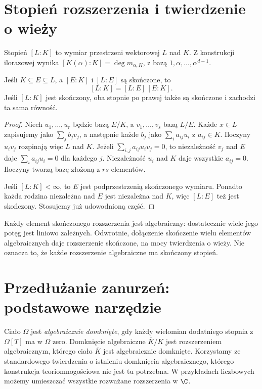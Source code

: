 \section{Stopień rozszerzenia i twierdzenie o wieży}

Stopień $[L:K]$ to wymiar przestrzeni wektorowej $L$ nad $K$. Z konstrukcji ilorazowej wynika $[K(\alpha):K]=\deg m_{\alpha,K}$, z bazą $1,\alpha,\dots,\alpha^{d-1}$.

\begin{twierdzenie}[O wieży]
Jeśli $K\subseteq E\subseteq L$, a $[E:K]$ i $[L:E]$ są skończone, to
\[
[L:K]=[L:E]\,[E:K].
\]
Jeśli $[L:K]$ jest skończony, oba stopnie po prawej także są skończone i zachodzi ta sama równość.
\end{twierdzenie}
\begin{proof}
Niech $u_1,\dots,u_r$ będzie bazą $E/K$, a $v_1,\dots,v_s$ bazą $L/E$. Każde $x\in L$ zapisujemy jako $\sum_j b_jv_j$, a następnie każde $b_j$ jako $\sum_i a_{ij}u_i$ z $a_{ij}\in K$. Iloczyny $u_iv_j$ rozpinają więc $L$ nad $K$. Jeżeli $\sum_{i,j}a_{ij}u_iv_j=0$, to niezależność $v_j$ nad $E$ daje $\sum_i a_{ij}u_i=0$ dla każdego $j$. Niezależność $u_i$ nad $K$ daje wszystkie $a_{ij}=0$. Iloczyny tworzą bazę złożoną z $rs$ elementów.

Jeśli $[L:K]<\infty$, to $E$ jest podprzestrzenią skończonego wymiaru. Ponadto każda rodzina niezależna nad $E$ jest niezależna nad $K$, więc $[L:E]$ też jest skończony. Stosujemy już udowodnioną część.
\end{proof}

Każdy element skończonego rozszerzenia jest algebraiczny: dostatecznie wiele jego potęg jest liniowo zależnych. Odwrotnie, dołączenie skończenie wielu elementów algebraicznych daje rozszerzenie skończone, na mocy twierdzenia o wieży. Nie oznacza to, że każde rozszerzenie algebraiczne ma skończony stopień.

\section{Przedłużanie zanurzeń: podstawowe narzędzie}

Ciało $\Omega$ jest \emph{algebraicznie domknięte}, gdy każdy wielomian dodatniego stopnia z $\Omega[T]$ ma w $\Omega$ zero. Domknięcie algebraiczne $\overline K/K$ jest rozszerzeniem algebraicznym, którego ciało $\overline K$ jest algebraicznie domknięte. Korzystamy ze standardowego twierdzenia o istnieniu domknięcia algebraicznego, którego konstrukcja teoriomnogościowa nie jest tu potrzebna. W przykładach liczbowych możemy umieszczać wszystkie rozważane rozszerzenia w $\C$.

